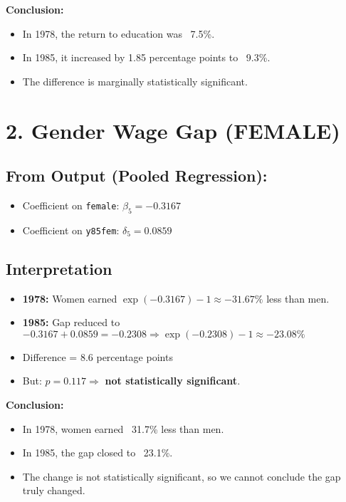 \documentclass[12pt, oneside]{article}
\begin{document}
\noindent\textbf{Conclusion:}  
\begin{itemize}
  \item In 1978, the return to education was ~7.5\%.
  \item In 1985, it increased by 1.85 percentage points to ~9.3\%.
  \item The difference is marginally statistically significant.
\end{itemize}

\section*{2. Gender Wage Gap (FEMALE)}

\subsection*{From Output (Pooled Regression):}
\begin{itemize}
  \item Coefficient on \texttt{female}: \( \beta_5 = -0.3167 \)
  \item Coefficient on \texttt{y85fem}: \( \delta_5 = 0.0859 \)
\end{itemize}

\subsection*{Interpretation}
\begin{itemize}
  \item \textbf{1978:} Women earned \( \exp(-0.3167) - 1 \approx -31.67\% \) less than men.
  \item \textbf{1985:} Gap reduced to \( -0.3167 + 0.0859 = -0.2308 \Rightarrow \exp(-0.2308) - 1 \approx -23.08\% \)
  \item Difference = 8.6 percentage points
  \item But: \( p = 0.117 \Rightarrow \) \textbf{not statistically significant}.
\end{itemize}

\noindent\textbf{Conclusion:}  
\begin{itemize}
  \item In 1978, women earned ~31.7\% less than men.
  \item In 1985, the gap closed to ~23.1\%.
  \item The change is not statistically significant, so we cannot conclude the gap truly changed.
\end{itemize}
\end{document}

